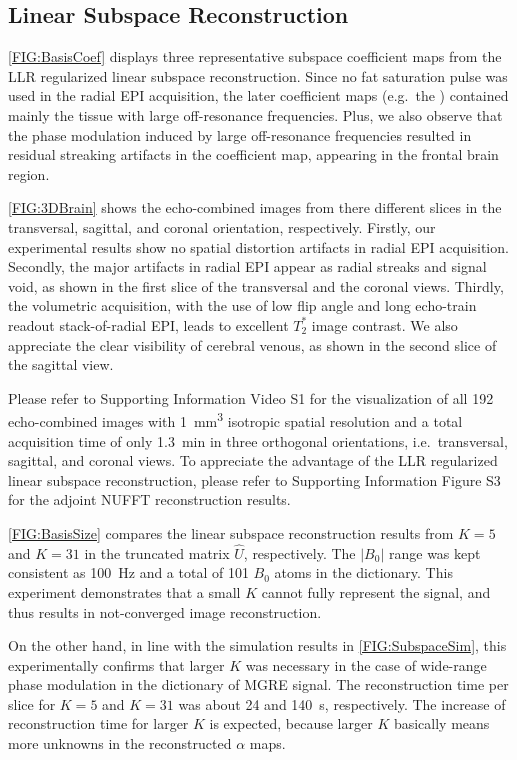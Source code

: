 \documentclass[a4paper,11pt]{article}
\begin{document}
\subsection*{Linear Subspace Reconstruction}

\cref{FIG:BasisCoef} displays three representative subspace coefficient maps
from the LLR regularized linear subspace reconstruction.
Since no fat saturation pulse was used in the radial EPI acquisition,
the later coefficient maps (e.g.~the ) contained mainly the tissue
with large off-resonance frequencies.
Plus, we also observe that the phase modulation
induced by large off-resonance frequencies
resulted in residual streaking artifacts
in the  coefficient map, appearing in the frontal brain region.

\cref{FIG:3DBrain} shows the echo-combined images from there different slices
in the transversal, sagittal, and coronal orientation, respectively.
Firstly, our experimental results show no spatial distortion artifacts
in radial EPI acquisition.
Secondly, the major artifacts in radial EPI appear as
radial streaks and signal void,
as shown in the first slice of the transversal and the coronal views.
Thirdly, the volumetric acquisition,
with the use of low flip angle and long echo-train readout stack-of-radial EPI,
leads to excellent $T_2^*$ image contrast.
We also appreciate the clear visibility of cerebral venous,
as shown in the second slice of the sagittal view.

Please refer to Supporting Information Video S1
for the visualization of all 192 echo-combined images
with \SI{1}{\cubic\mm} isotropic spatial resolution and
a total acquisition time of only \SI{1.3}{\minute}
in three orthogonal orientations,
i.e.~transversal, sagittal, and coronal views.
To appreciate the advantage of the LLR regularized
linear subspace reconstruction,
please refer to Supporting Information Figure S3
for the adjoint NUFFT reconstruction results.

\cref{FIG:BasisSize} compares the linear subspace reconstruction results
from $K=5$ and $K=31$ in the truncated matrix $\hat{U}$, respectively.
The $|B_0|$ range was kept consistent as 100~\si{\Hz} and
a total of 101 $B_0$ atoms in the dictionary.
This experiment demonstrates that a small $K$ cannot fully represent the signal,
and thus results in not-converged image reconstruction.

On the other hand, in line with the simulation results in \cref{FIG:SubspaceSim},
this experimentally confirms that larger $K$ was necessary
in the case of wide-range phase modulation in the dictionary of MGRE signal.
The reconstruction time per slice for $K = 5$ and $K = 31$
was about \num{24} and \SI{140}{\second}, respectively.
The increase of reconstruction time for larger $K$ is expected,
because larger $K$ basically means more unknowns
in the reconstructed $\alpha$ maps.
\end{document}
